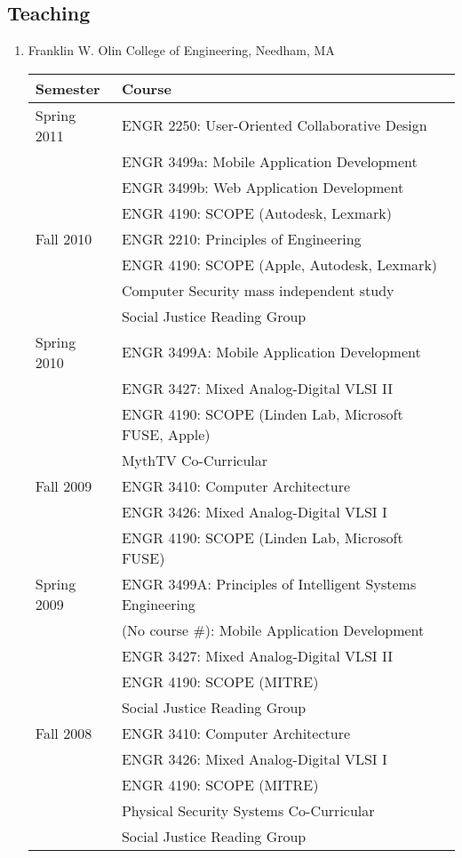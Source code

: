 \documentclass[line]{res}
\begin{document}
\begin{resume}
	\section{\sc Teaching}
	\begin{enumerate}
		\item Franklin W. Olin College of Engineering, Needham, MA
		\begin{longtable}
			{ |l|l| } \hline \textbf{Semester} & \textbf{Course} \\
			\hline Spring 2011 & ENGR 2250: User-Oriented Collaborative Design\\
			& ENGR 3499a: Mobile Application Development \\
			& ENGR 3499b: Web Application Development \\
			& ENGR 4190: SCOPE (Autodesk, Lexmark) \\
			\hline
			
			Fall 2010 & ENGR 2210: Principles of Engineering\\
			& ENGR 4190: SCOPE (Apple, Autodesk, Lexmark) \\
			& Computer Security mass independent study\\
			& Social Justice Reading Group\\
			\hline
			
			Spring 2010 & ENGR 3499A: Mobile Application Development \\
			& ENGR 3427: Mixed Analog-Digital VLSI II \\
			& ENGR 4190: SCOPE (Linden Lab, Microsoft FUSE, Apple) \\
			& MythTV Co-Curricular \\
			\hline
			
			Fall 2009 & ENGR 3410: Computer Architecture \\
			& ENGR 3426: Mixed Analog-Digital VLSI I \\
			& ENGR 4190: SCOPE (Linden Lab, Microsoft FUSE) \\
			\hline
			
			Spring 2009 & ENGR 3499A: Principles of Intelligent Systems Engineering \\
			& (No course \#): Mobile Application Development \\
			& ENGR 3427: Mixed Analog-Digital VLSI II \\
			& ENGR 4190: SCOPE (MITRE) \\
			& Social Justice Reading Group \\
			\hline
			
			Fall 2008 & ENGR 3410: Computer Architecture \\
			& ENGR 3426: Mixed Analog-Digital VLSI I \\
			& ENGR 4190: SCOPE (MITRE) \\
			& Physical Security Systems Co-Curricular \\
			& Social Justice Reading Group \\
			\hline
			

\end{longtable}
\end{enumerate}
\end{resume}
\end{document}
